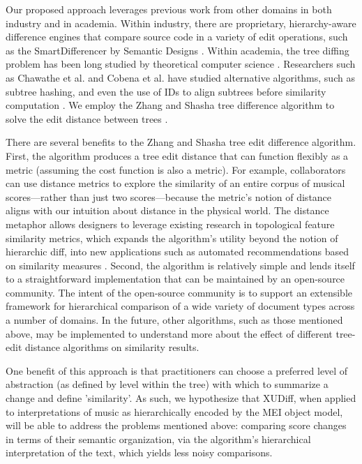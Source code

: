 \documentclass{article}
\begin{document}
Our proposed approach leverages previous work from other domains in both
industry and in academia.  Within industry, there are proprietary,
hierarchy-aware difference engines that compare source code in a variety of 
edit operations, such as the SmartDifferencer by Semantic Designs
\cite{Designs:qm}.  Within academia, the tree diffing problem has been
long studied by theoretical computer science \cite{Bille:2005ec}.
Researchers such as Chawathe et al. and Cobena et
al. have studied alternative algorithms, such as subtree hashing, 
and even the use of IDs to align subtrees before similarity 
computation \cite{Chawathe:1996jb,Cobena:2002gd}.  We employ the Zhang 
and Shasha tree difference algorithm to solve the edit distance between
trees \cite{Zhang:1989ec,Zhang:1989il}.

There are several benefits to the Zhang and Shasha tree edit
difference algorithm.  First, the algorithm produces a tree edit
distance that can function flexibly as a metric (assuming the cost function is also a metric). For example, collaborators
can use distance metrics to explore the similarity of an entire corpus of 
musical scores---rather than just two scores---because the metric's notion of distance aligns
with our intuition about distance in the physical world. The distance metaphor allows designers to leverage existing research in topological feature similarity metrics, which expands the algorithm's utility beyond the notion of hierarchic diff, into new applications such as automated recommendations based on similarity measures \cite{bello2011measuring,berenzweig2004large,panagakis2010music}. Second, the
algorithm is relatively simple and lends itself to a
straightforward implementation that can be maintained by an
open-source community.  The intent of the open-source community is to
support an extensible framework for hierarchical comparison of a wide
variety of document types across a number of domains.  In the future,
other algorithms, such as those mentioned above, may be implemented to
understand more about the effect of different tree-edit distance
algorithms on similarity results.

One benefit of this approach is that practitioners can choose a
preferred level of abstraction (as defined by level within the tree)
with which to summarize a change and define 'similarity'.  As such, we
hypothesize that XUDiff, when applied to interpretations of music as
hierarchically encoded by the MEI object model, will be able to
address the problems mentioned above: comparing score changes in terms
of their semantic organization, via the algorithm's hierarchical
interpretation of the text, which yields less noisy comparisons.
\end{document}
